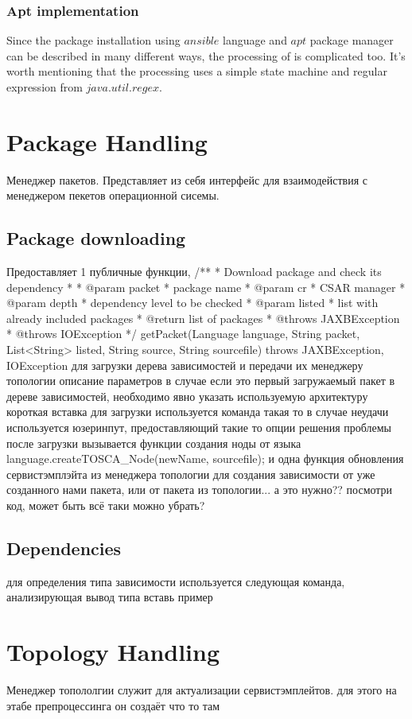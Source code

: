 \subsubsection*{Apt implementation}
Since the package installation using $ansible$ language and $apt$ package manager can be described in many different ways, the processing of is complicated too.
It's worth mentioning that the processing uses a simple state machine and regular expression from $java$.$util$.$regex$.

\section{Package Handling}
Менеджер пакетов. Представляет из себя интерфейс для взаимодействия с менеджером пекетов операционной сисемы. 
\fi
\subsection*{Package downloading}

Предоставляет 1 публичные функции, 
/**
* Download package and check its dependency
* 
* @param packet
*            package name
* @param cr
*            CSAR manager
* @param depth
*            dependency level to be checked
* @param listed
*            list with already included packages
* @return list of packages
* @throws JAXBException
* @throws IOException
*/
getPacket(Language language, String packet,
List<String> listed, String source, String sourcefile)
throws JAXBException, IOException 
для загрузки дерева зависимостей и передачи их менеджеру топологии
описание параметров
в случае если это первый загружаемый пакет в дереве зависимостей, необходимо явно указать используемую архитектуру
короткая вставка
для загрузки используется команда такая то
в случае неудачи используется юзеринпут, предоставляющий такие то опции решения проблемы
после загрузки вызывается функции создания ноды от языка
language.createTOSCA_Node(newName, sourcefile);
и одна функция обновления сервистэмплэйта из менеджера топологии
для создания зависимости от уже созданного нами пакета, или от пакета  из топологии... а это нужно?? посмотри код, может быть всё таки можно убрать?

\fi
\subsection*{Dependencies}
для определения типа зависимости используется следующая команда, анализирующая вывод типа 
вставь пример
\fi
\section{Topology Handling}
Менеджер топололгии служит для актуализации сервистэмплейтов. для этого на этабе препроцессинга он создаёт что то там
\fi
